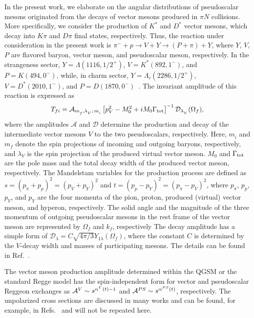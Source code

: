 \documentclass[a4paper,12pt]{article}
\begin{document}
In the present work, we elaborate on the angular distributions of pseudoscalar mesons originated from
the decays of vector mesons produced in $\pi N$ collisions.
More specifically, we consider the production of $K^*$ and $D^*$ vector mesons,
which decay into $K\pi$ and $D\pi$ final states, respectively.
Thus, the reaction under consideration in the present work is
$\pi^- + p \to V + Y \to (P + \pi) + Y$, where
$Y$, $V$, $P$ are flavored baryon, vector meson, and pseudoscalar meson, respectively.
In the strangeness sector, $Y = \Lambda(1116,1/2^+)$, $V = K^*(892,1^-)$,
and $P = K(494,0^-)$, while, in charm sector, $Y = \Lambda_c(2286,1/2^+)$, $V = D^*(2010,1^-)$,
and $P = D(1870,0^-)$~\cite{PDG16}.
The invariant amplitude of this reaction is expressed as
\begin{eqnarray}
T_{fi} = \mathcal{A}_{m_f^{}, \lambda_V^{}; \,m_i^{}}
\left[{p_V^2 - M_0^2 + i M_0 \Gamma_{\rm tot}}\right]^{-1}
\mathcal{D}_{\lambda_V^{}}(\Omega_f),
\label{EQ2}
\end{eqnarray}
where the amplitudes $\mathcal{A}$ and $\mathcal{D}$ determine the production and decay of
the intermediate vector mesons $V$ to the two pseudoscalars, respectively.
Here, $m_i^{}$ and $m_f^{}$ denote the spin projections of incoming and outgoing baryons,
respectively, and $\lambda_V^{}$ is the spin projection of the produced virtual vector meson.
$M_0$ and $\Gamma_{\rm tot}$ are the pole mass and the total decay width of the produced vector meson,
respectively.
The Mandelstam variables for the production process are defined as
$s = (p_\pi^{} + p_p^{})^2 = (p_V^{} + p_Y^{})^2$
and $t = (p_p^{} - p_Y^{})^2 = (p_\pi^{} - p_V^{})^2$, where $p_\pi^{}$, $p_p^{}$, $p_V^{}$, and
$p_Y^{}$ are the four momenta of the pion, proton, produced (virtual) vector meson, and hyperon,
respectively.
The solid angle and the magnitude of the three momentum of outgoing pseudoscalar mesons
in the rest frame of the vector meson are represented by $\Omega_f$ and $k_f$, respectively
The decay amplitude has a simple form of
$\mathcal{D}_\lambda = C \sqrt{{4\pi}/{3}} Y_{1\lambda}(\Omega_f)$,
where the constant $C$ is determined by the $V$-decay width and masses of
participating mesons. The details can be found in Ref.~\cite{SOT}.


The vector meson production amplitude determined within the QGSM or the standard Regge
model has the spin-independent form
for vector and pseudoscalar Reggeon exchanges as
${\cal A}^V\sim s^{\alpha^{V}(t)-1}$ and ${\cal A}^{PS}\sim s^{\alpha^{PS}(t)}$,
respectively. The unpolarized cross sections are discussed in many
works and can be found, for example, in Refs.~\cite{TK08,BK83} and will not be repeated here.
\end{document}
